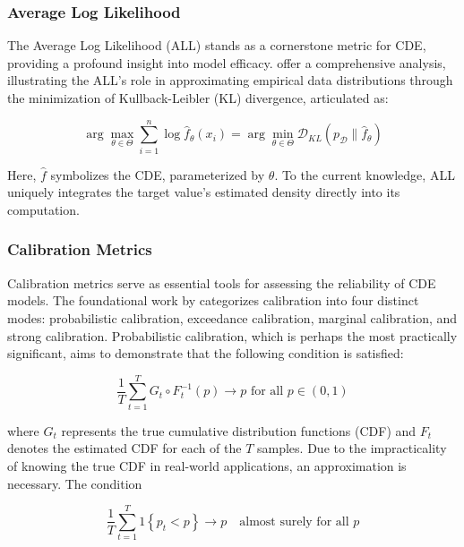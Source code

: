 \documentclass{article}
\begin{document}
\subsubsection{Average Log Likelihood}\label{sec:mean_log_likelihood}

The Average Log Likelihood (ALL) stands as a cornerstone metric for CDE, providing a profound insight into model efficacy. \citep{rothfuss2019noise} offer a comprehensive analysis, illustrating the ALL's role in approximating empirical data distributions through the minimization of Kullback-Leibler (KL) divergence, articulated as:

\begin{equation}
\arg \max _{\theta \in \Theta} \sum_{i=1}^n \log \hat{f}_\theta\left(x_i\right)=\arg \min _{\theta \in \Theta} \mathcal{D}_{K L}\left(p_{\mathcal{D}} \| \hat{f}_\theta\right)
\end{equation}

Here, \(\hat{f}\) symbolizes the CDE, parameterized by \(\theta\). To the current knowledge, ALL uniquely integrates the target value's estimated density directly into its computation.

\subsubsection{Calibration Metrics}

Calibration metrics serve as essential tools for assessing the reliability of CDE models. The foundational work by \citep{gneiting2007probabilistic} categorizes calibration into four distinct modes: probabilistic calibration, exceedance calibration, marginal calibration, and strong calibration. Probabilistic calibration, which is perhaps the most practically significant, aims to demonstrate that the following condition is satisfied:

\begin{equation}
\frac{1}{T} \sum_{t=1}^T G_t \circ F_t^{-1}(p) \longrightarrow p \text{ for all } p \in (0,1)
\end{equation}

where $G_t$ represents the true cumulative distribution functions (CDF) and $F_t$ denotes the estimated CDF for each of the $T$ samples. Due to the impracticality of knowing the true CDF in real-world applications, an approximation is necessary. The condition

\begin{equation}
\frac{1}{T} \sum_{t=1}^T 1\left\{p_t<p\right\} \longrightarrow p \quad \text{almost surely for all } p
\end{equation}\label{eq:practical_probabilistic_calibration}
\end{document}
